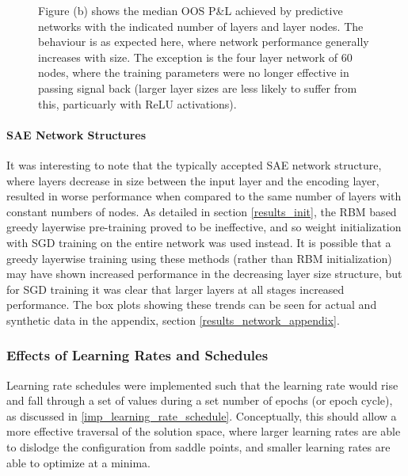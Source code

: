 \documentclass[a4paper,11pt,oneside]{article}
\theoremstyle{plain}
\theoremstyle{definition}
\begin{document}
\begin{figure}[H]
{		\newline Figure (b) shows the median OOS P\&L achieved by predictive networks with the indicated number of layers and layer nodes. The behaviour is as expected here, where network performance generally increases with size. The exception is the four layer network of 60 nodes, where the training parameters were no longer effective in passing signal back (larger layer sizes are less likely to suffer from this, particuarly with ReLU activations).
	}
	\label{figure-network_size}
\end{figure}

\paragraph{SAE Network Structures}

It was interesting to note that the typically accepted SAE network structure, where layers decrease in size between the input layer and the encoding layer, resulted in worse performance when compared to the same number of layers with constant numbers of nodes. As detailed in section \ref{results_init}, the RBM based greedy layerwise pre-training proved to be ineffective, and so weight initialization with SGD training on the entire network was used instead. It is possible that a greedy layerwise training using these methods (rather than RBM initialization) may have shown increased performance in the decreasing layer size structure, but for SGD training it was clear that larger layers at all stages increased performance. The box plots showing these trends can be seen for actual and synthetic data in the appendix, section \ref{results_network_appendix}.



\subsubsection{Effects of Learning Rates and Schedules}\label{results_lr}

Learning rate schedules were implemented such that the learning rate would rise and fall through a set of values during a set number of epochs (or epoch cycle), as discussed in \ref{imp_learning_rate_schedule}.	Conceptually, this should allow a more effective traversal of the solution space, where larger learning rates are able to dislodge the configuration from saddle points, and smaller learning rates are able to optimize at a minima. \newline
\end{document}
